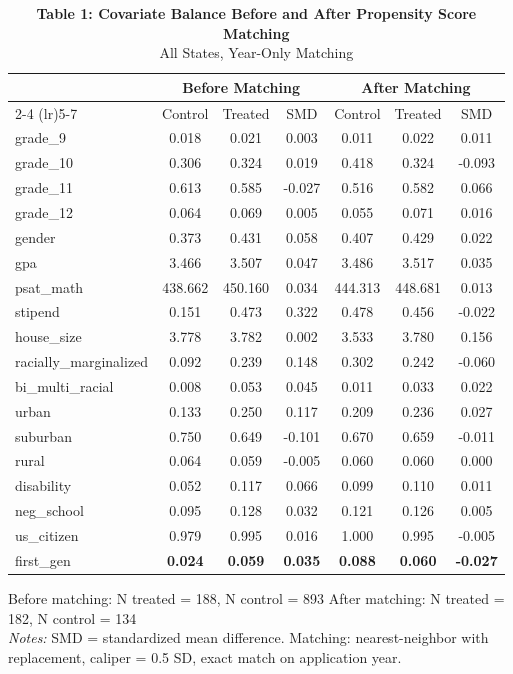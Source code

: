 \begin{table}[t]
\caption*{
{\fontsize{10}{12}\selectfont  \textbf{Table 1: Covariate Balance Before and After Propensity Score Matching}\fontsize{8}{10}\selectfont } \\ 
{\fontsize{8}{10}\selectfont  All States, Year-Only Matching\fontsize{8}{10}\selectfont }
} 
\fontsize{8.0pt}{10.0pt}\selectfont
\begin{tabular*}{\linewidth}{@{\extracolsep{\fill}}l|cccccc}
\toprule
 & \multicolumn{3}{c}{Before Matching} & \multicolumn{3}{c}{After Matching} \\ 
\cmidrule(lr){2-4} \cmidrule(lr){5-7}
 & Control & Treated & SMD & Control & Treated & SMD \\ 
\midrule\addlinespace[2.5pt]
grade\_9 & {0.018} & {0.021} & {0.003} & {0.011} & {0.022} & {0.011} \\ 
grade\_10 & 0.306 & 0.324 & 0.019 & 0.418 & 0.324 & -0.093 \\ 
grade\_11 & 0.613 & 0.585 & -0.027 & 0.516 & 0.582 & 0.066 \\ 
grade\_12 & 0.064 & 0.069 & 0.005 & 0.055 & 0.071 & 0.016 \\ 
gender & 0.373 & 0.431 & 0.058 & 0.407 & 0.429 & 0.022 \\ 
gpa & 3.466 & 3.507 & 0.047 & 3.486 & 3.517 & 0.035 \\ 
psat\_math & 438.662 & 450.160 & 0.034 & 444.313 & 448.681 & 0.013 \\ 
stipend & 0.151 & 0.473 & 0.322 & 0.478 & 0.456 & -0.022 \\ 
house\_size & 3.778 & 3.782 & 0.002 & 3.533 & 3.780 & 0.156 \\ 
racially\_marginalized & 0.092 & 0.239 & 0.148 & 0.302 & 0.242 & -0.060 \\ 
bi\_multi\_racial & 0.008 & 0.053 & 0.045 & 0.011 & 0.033 & 0.022 \\ 
urban & 0.133 & 0.250 & 0.117 & 0.209 & 0.236 & 0.027 \\ 
suburban & 0.750 & 0.649 & -0.101 & 0.670 & 0.659 & -0.011 \\ 
rural & 0.064 & 0.059 & -0.005 & 0.060 & 0.060 & 0.000 \\ 
disability & 0.052 & 0.117 & 0.066 & 0.099 & 0.110 & 0.011 \\ 
neg\_school & 0.095 & 0.128 & 0.032 & 0.121 & 0.126 & 0.005 \\ 
us\_citizen & 0.979 & 0.995 & 0.016 & 1.000 & 0.995 & -0.005 \\ 
first\_gen & {\bfseries 0.024} & {\bfseries 0.059} & {\bfseries 0.035} & {\bfseries 0.088} & {\bfseries 0.060} & {\bfseries -0.027} \\ 
\bottomrule
\end{tabular*}
\begin{minipage}{\linewidth}
\vspace{.05em}
Before matching: N treated = 188, N control = 893 \textbar{} After matching: N treated = 182, N control = 134\\
\emph{Notes:} SMD = standardized mean difference. Matching: nearest-neighbor with replacement, caliper = 0.5 SD, exact match on application year.\\
\end{minipage}
\end{table}


